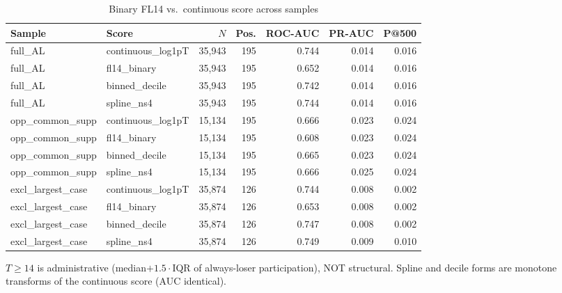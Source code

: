 \begin{table}[htbp]\centering\footnotesize
\caption{Binary FL14 vs.\ continuous score across samples}
\label{tab:binary_vs_continuous}
\begin{tabular}{llrrrrr}\hline
Sample & Score & $N$ & Pos. & ROC-AUC & PR-AUC & P@500 \\\hline
full\_AL & continuous\_log1pT & 35,943 & 195 & 0.744 & 0.014 & 0.016 \\
full\_AL & fl14\_binary & 35,943 & 195 & 0.652 & 0.014 & 0.016 \\
full\_AL & binned\_decile & 35,943 & 195 & 0.742 & 0.014 & 0.016 \\
full\_AL & spline\_ns4 & 35,943 & 195 & 0.744 & 0.014 & 0.016 \\
opp\_common\_supp & continuous\_log1pT & 15,134 & 195 & 0.666 & 0.023 & 0.024 \\
opp\_common\_supp & fl14\_binary & 15,134 & 195 & 0.608 & 0.023 & 0.024 \\
opp\_common\_supp & binned\_decile & 15,134 & 195 & 0.665 & 0.023 & 0.024 \\
opp\_common\_supp & spline\_ns4 & 15,134 & 195 & 0.666 & 0.025 & 0.024 \\
excl\_largest\_case & continuous\_log1pT & 35,874 & 126 & 0.744 & 0.008 & 0.002 \\
excl\_largest\_case & fl14\_binary & 35,874 & 126 & 0.653 & 0.008 & 0.002 \\
excl\_largest\_case & binned\_decile & 35,874 & 126 & 0.747 & 0.008 & 0.002 \\
excl\_largest\_case & spline\_ns4 & 35,874 & 126 & 0.749 & 0.009 & 0.010 \\
\hline\end{tabular}
\begin{tablenotes}\footnotesize\item $T\!\ge\!14$ is administrative (median$+1.5\cdot$IQR of always-loser participation), NOT structural. Spline and decile forms are monotone transforms of the continuous score (AUC identical).\end{tablenotes}
\end{table}
